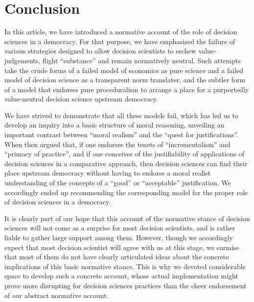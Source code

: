 \documentclass[preprint,11pt]{elsarticle}
\begin{document}
\section{Conclusion}
\noindent In this article, we have introduced a normative account of the role of decision sciences in a democracy. For that purpose, we have emphasized the failure of various strategies designed to allow decision scientists to eschew value-judgements, flight ``substance'' and remain normatively neutral. Such attempts take the crude forms of a failed model of economics as pure science and a failed model of decision science as a transparent norm translater, and the subtler form of a model that endorses pure proceduralism to arrange a place for a purportedly value-neutral decision science upstream democracy.

We have strived to demonstrate that all these models fail, which has led us to develop an inquiry into a basic structure of moral reasoning, unveiling an important contrast between ``moral realism'' and the ``quest for justifications''. When then argued that, if one endorses the tenets of ``incrementalism'' and ``primacy of practice'', and if one conceives of the justifiability of applications of decision sciences in a comparative approach, then decision sciences can find their place upstream democracy without having to endorse a moral realist understanding of the concepts of a ``good'' or ``acceptable'' justification. We accordingly ended up recommending the corresponding model for the proper role of decision sciences in a democracy.

 It is clearly part of our hope that this account of the normative stance of decision sciences will not come as a surprise for most decision scientists, and is rather liable to gather large support among them. However, though we accordingly expect that most decision scientist will agree with us at this stage, we surmise that most of them do not have clearly articulated ideas about the concrete implications of this basic normative stance. This is why we devoted considerable space to develop such a concrete account, whose actual implementation might prove more disrupting for decision sciences practices than the cheer endorsement of our abstract normative account.

\end{document}
